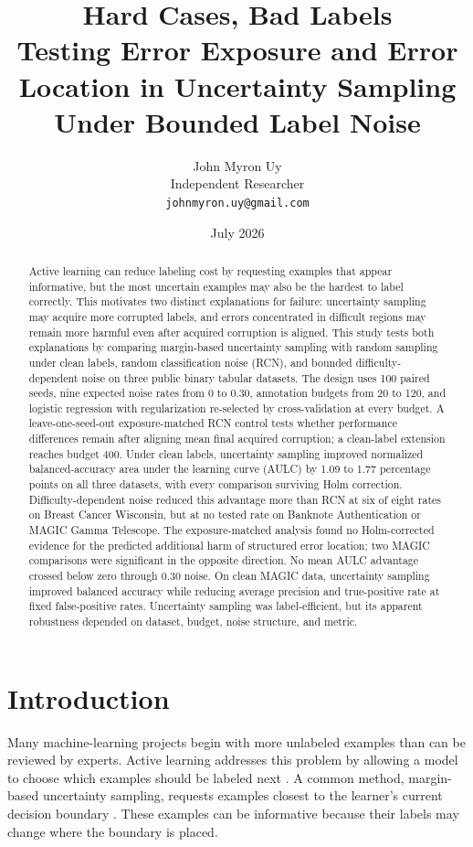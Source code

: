 \documentclass[11pt]{article}
\title{\textbf{Hard Cases, Bad Labels}\\
\large Testing Error Exposure and Error Location in Uncertainty Sampling
Under Bounded Label Noise}
\author{
  John Myron Uy\\
  \small Independent Researcher\\
  \small \texttt{johnmyron.uy@gmail.com}
}
\date{July 2026}
\begin{document}
\maketitle

\begin{abstract}
Active learning can reduce labeling cost by requesting examples that appear
informative, but the most uncertain examples may also be the hardest to label
correctly. This motivates two distinct explanations for failure: uncertainty
sampling may acquire more corrupted labels, and errors concentrated in
difficult regions may remain more harmful even after acquired corruption is
aligned. This study tests both explanations by comparing margin-based
uncertainty sampling with random sampling under clean labels, random
classification noise (RCN), and bounded difficulty-dependent noise on three
public binary tabular datasets. The design uses 100 paired seeds, nine
expected noise rates from 0 to 0.30, annotation budgets from 20 to 120, and
logistic regression with regularization re-selected by cross-validation at
every budget. A leave-one-seed-out exposure-matched RCN control tests whether
performance differences remain after aligning mean final acquired corruption;
a clean-label extension reaches budget 400. Under clean labels, uncertainty
sampling improved normalized balanced-accuracy area under the learning curve
(AULC) by 1.09 to 1.77 percentage points on all three datasets, with every
comparison surviving Holm correction. Difficulty-dependent noise reduced this
advantage more than RCN at six of eight rates on Breast Cancer Wisconsin, but
at no tested rate on Banknote Authentication or MAGIC Gamma Telescope. The
exposure-matched analysis found no Holm-corrected evidence for the predicted
additional harm of structured error location; two MAGIC comparisons were
significant in the opposite direction. No mean AULC advantage crossed below
zero through 0.30 noise. On clean MAGIC data, uncertainty sampling improved
balanced accuracy while reducing average precision and true-positive rate at
fixed false-positive rates. Uncertainty sampling was label-efficient, but its
apparent robustness depended on dataset, budget, noise structure, and metric.
\end{abstract}

\section{Introduction}

Many machine-learning projects begin with more unlabeled examples than can be
reviewed by experts. Active learning addresses this problem by allowing a
model to choose which examples should be labeled next \citep{settles2009}. A
common method, margin-based uncertainty sampling, requests examples closest
to the learner's current decision boundary \citep{lewis1994}. These examples
can be informative because their labels may change where the boundary is
placed.
\end{document}
